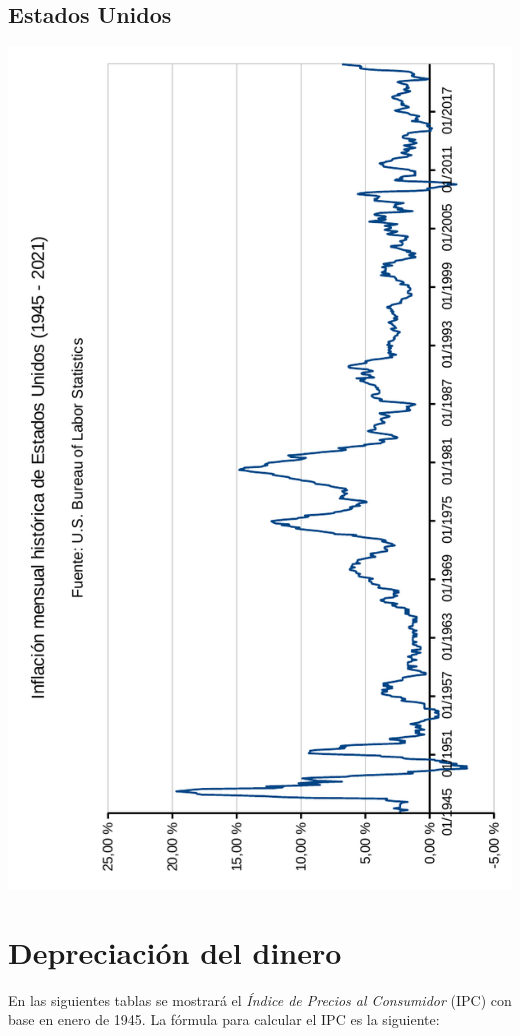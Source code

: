 \documentclass[12pt,a4paper,twoside]{book}
\begin{document}

\newpage

\subsection{Estados Unidos}

\newpage

\begin{center}
\includegraphics[scale=0.975,angle=180]{img/infl-usa.pdf}
\end{center}
\newpage

\section{Depreciación del dinero}
En las siguientes tablas se mostrará el \textit{Índice de Precios al Consumidor} (IPC) con base en enero de 1945. La fórmula para calcular el IPC es la siguiente:
\end{document}
